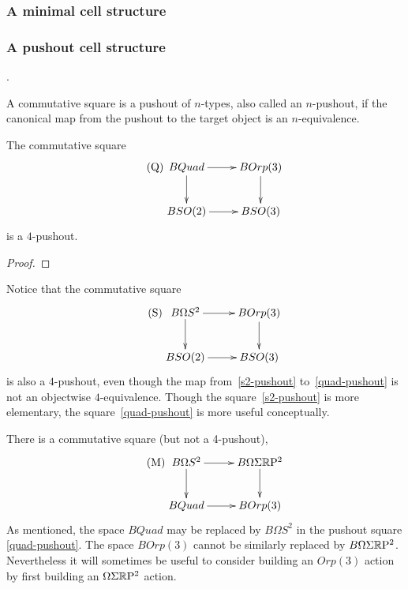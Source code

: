 \documentclass{amsart}
\begin{document}
\subsubsection{A minimal cell structure}

\subsubsection{A pushout cell structure}
.

\begin{definition}
A commutative square is a pushout of $n$-types, also called an $n$-pushout, if the canonical map from the pushout to the target object is an $n$-equivalence.
\end{definition}

\begin{proposition}
The commutative square
\begin{equation} \label{quad-pushout} \tag{Q}
\xymatrix{
BQuad \ar[r] \ar[d] & BOrp(3) \ar[d] \\
BSO(2) \ar[r] & BSO(3)
}
\end{equation}
is a $4$-pushout.
\end{proposition}
\begin{proof}
\end{proof}

\begin{remark}
Notice that the commutative square
\begin{equation}\label{s2-pushout} \tag{S}
\xymatrix{
B\Omega S^2 \ar[r] \ar[d] & BOrp(3) \ar[d] \\
BSO(2) \ar[r] & BSO(3)
}
\end{equation}
is also a $4$-pushout, even though the map from~\eqref{s2-pushout} to~\eqref{quad-pushout} is not an objectwise $4$-equivalence.  Though the square~\eqref{s2-pushout} is more elementary, the square~\eqref{quad-pushout} is more useful conceptually.
\end{remark}

\begin{remark}
There is a commutative square (but not a 4-pushout),
\begin{equation}\label{quadmoore} \tag{M}
\xymatrix{
B\Omega S^2 \ar[r] \ar[d] & B\Omega \Sigma \RP^2 \ar[d] \\
BQuad \ar[r] & BOrp(3)
}
\end{equation}
As mentioned, the space $BQuad$ may be replaced by $B\Omega S^2$ in the pushout square \eqref{quad-pushout}.  The space $BOrp(3)$ cannot be similarly replaced by $B\Omega \Sigma \mathbb R \mathrm{P}^2$.  Nevertheless it will sometimes be useful to consider building an $Orp(3)$ action by first building an $\Omega \Sigma \mathbb R \mathrm{P}^2$ action.
\end{remark}
\end{document}
